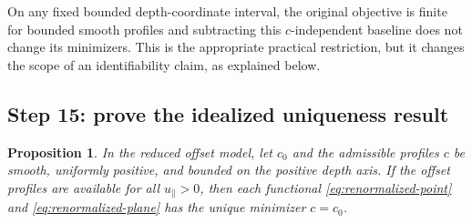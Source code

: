 \documentclass[11pt]{article}
\newtheorem{proposition}{Proposition}
\begin{document}
On any fixed bounded depth-coordinate interval, the original objective
is finite for bounded smooth profiles and subtracting this
$c$-independent baseline does not change its minimizers. This is the
appropriate practical restriction, but it changes the scope of an
identifiability claim, as explained below.

\subsection{Step 15: prove the idealized uniqueness result}

\begin{proposition}
In the reduced offset model, let $c_0$ and the admissible profiles $c$
be smooth, uniformly positive, and bounded on the positive depth axis.
If the offset profiles are available for all $u_\parallel>0$, then
each functional \eqref{eq:renormalized-point} and
\eqref{eq:renormalized-plane} has the unique minimizer $c=c_0$.
\end{proposition}
\end{document}
